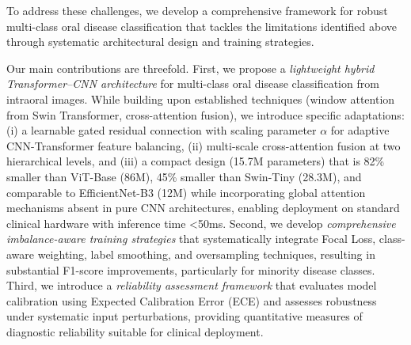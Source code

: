 To address these challenges, we develop a comprehensive framework for robust multi-class oral disease classification that tackles the limitations identified above through systematic architectural design and training strategies.

Our main contributions are threefold. First, we propose a \textit{lightweight hybrid Transformer–CNN architecture} for multi-class oral disease classification from intraoral images. While building upon established techniques (window attention from Swin Transformer, cross-attention fusion), we introduce specific adaptations: (i) a learnable gated residual connection with scaling parameter $\alpha$ for adaptive CNN-Transformer feature balancing, (ii) multi-scale cross-attention fusion at two hierarchical levels, and (iii) a compact design (15.7M parameters) that is 82\% smaller than ViT-Base (86M), 45\% smaller than Swin-Tiny (28.3M), and comparable to EfficientNet-B3 (12M) while incorporating global attention mechanisms absent in pure CNN architectures, enabling deployment on standard clinical hardware with inference time <50ms. Second, we develop \textit{comprehensive imbalance-aware training strategies} that systematically integrate Focal Loss, class-aware weighting, label smoothing, and oversampling techniques, resulting in substantial F1-score improvements, particularly for minority disease classes. Third, we introduce a \textit{reliability assessment framework} that evaluates model calibration using Expected Calibration Error (ECE) and assesses robustness under systematic input perturbations, providing quantitative measures of diagnostic reliability suitable for clinical deployment.